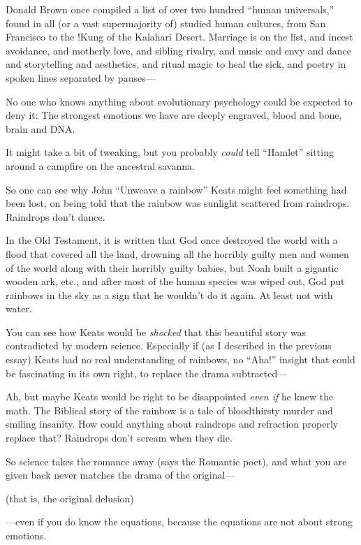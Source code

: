 {
 Donald Brown once compiled a list of over two hundred
``human universals,'' found in all
(or a vast supermajority of) studied human cultures, from San Francisco
to the !Kung of the Kalahari Desert. Marriage is on the list, and
incest avoidance, and motherly love, and sibling rivalry, and music and
envy and dance and storytelling and aesthetics, and ritual magic to
heal the sick, and poetry in spoken lines separated by pauses---}

{
 No one who knows anything about evolutionary psychology could be
expected to deny it: The strongest emotions we have are deeply
engraved, blood and bone, brain and DNA.}

{
 It might take a bit of tweaking, but you probably \textit{could}
tell ``Hamlet'' sitting around a
campfire on the ancestral savanna.}

{
 So one can see why John ``Unweave a
rainbow'' Keats might feel something had been lost,
on being told that the rainbow was sunlight scattered from raindrops.
Raindrops don't dance.}

{
 In the Old Testament, it is written that God once destroyed the
world with a flood that covered all the land, drowning all the horribly
guilty men and women of the world along with their horribly guilty
babies, but Noah built a gigantic wooden ark, etc., and after most of
the human species was wiped out, God put rainbows in the sky as a sign
that he wouldn't do it again. At least not with water.}

{
 You can see how Keats would be \textit{shocked} that this
beautiful story was contradicted by modern science. Especially if (as I
described in the previous essay) Keats had no real understanding of
rainbows, no ``Aha!'' insight that
could be fascinating in its own right, to replace the drama
subtracted---}

{
 Ah, but maybe Keats would be right to be disappointed \textit{even
if} he knew the math. The Biblical story of the rainbow is a tale of
bloodthirsty murder and smiling insanity. How could anything about
raindrops and refraction properly replace that? Raindrops
don't scream when they die.}

{
 So science takes the romance away (says the Romantic poet), and
what you are given back never matches the drama of the original---}

{
 (that is, the original delusion)}

{
 {}---even if you do know the equations, because the equations are
not about strong emotions.}

